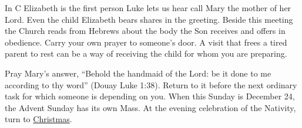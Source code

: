 In C Elizabeth is the first person Luke lets us hear call Mary the mother
of her Lord. Even the child Elizabeth bears shares in the greeting.
Beside this meeting the Church reads from Hebrews about the body the
Son receives and offers in obedience. Carry your own prayer to someone's
door. A visit that frees a tired parent to rest can be a way of receiving
the child for whom you are preparing.

Pray Mary's answer, “Behold the handmaid of the Lord: be it done to me
according to thy word” (Douay Luke 1:38). Return to it before the next
ordinary task for which someone is depending on you. When this Sunday
is December 24, the Advent Sunday has its own Mass. At the evening
celebration of the Nativity, turn to \hyperref[sec:pc-christmas]{Christmas}.
